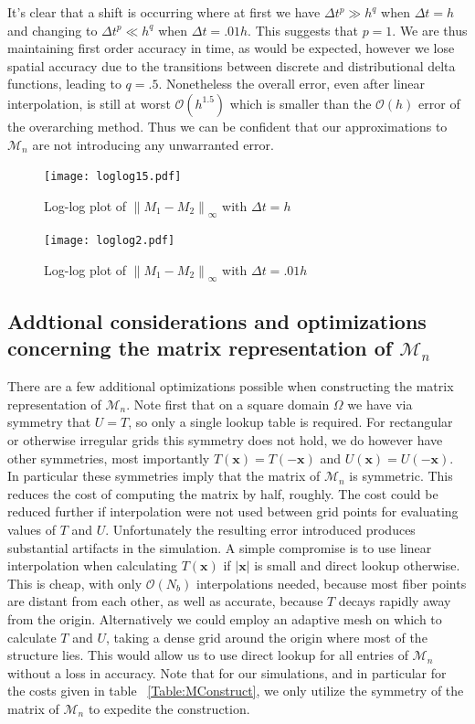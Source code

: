 \documentclass[preprint,12pt]{elsarticle}
\newcommand{\norm}[1]{\left\lVert#1\right\rVert}
\begin{document}
It's clear that a shift is occurring where at first we have $\Delta t^p \gg h^q$ when $\Delta t = h$ and changing to $\Delta t^p \ll h^q$ when $\Delta t = .01h$. This suggests that $p=1$. We are thus maintaining first order accuracy in time, as would be expected, however we lose spatial accuracy due to the transitions between discrete and distributional delta functions, leading to $q=.5$. Nonetheless the overall error, even after linear interpolation, is still at worst $\mathcal{O}(h^{1.5})$ which is smaller than the $\mathcal{O}(h)$ error of the overarching method. Thus we can be confident that our approximations to $\mathcal{M}_n$ are not introducing any unwarranted error.


\begin{figure}[!b]
  \begin{center}
    \texttt{[image: loglog15.pdf]}
  \end{center}
  \caption{\small Log-log plot of $\norm{M_1-M_2}_\infty$ with $\Delta t = h$}
  \label{fig:loglog15}
\hfill
  \begin{center}
    \texttt{[image: loglog2.pdf]}
  \end{center}
  \caption{\small Log-log plot of $\norm{M_1-M_2}_\infty$ with $\Delta t = .01h$}
  \label{fig:loglog2}
\end{figure}

\subsection{Addtional considerations and optimizations concerning the matrix representation of $\mathcal{M}_n$}
There are a few additional optimizations possible when constructing the matrix representation of $\mathcal{M}_n$.
Note first that on a square domain $\Omega$ we have via symmetry that $U=T$, so only a single lookup table is required.
For rectangular or otherwise irregular grids this symmetry does not hold, we do however have other symmetries, most importantly $T(\mathbf{x}) = T(-\mathbf{x})$ and $U(\mathbf{x}) = U(-\mathbf{x})$.
In particular these symmetries imply that the matrix of $\mathcal{M}_n$ is symmetric. This reduces the cost of computing the matrix by half, roughly. The cost could be reduced further if interpolation were not used between grid points for evaluating values of $T$ and $U$. Unfortunately the resulting error introduced produces substantial artifacts in the simulation. A simple compromise is to use linear interpolation when calculating $T(\mathbf{x})$ if $|\mathbf{x}|$ is small and direct lookup otherwise. This is cheap, with only $\mathcal{O}(N_b)$ interpolations needed, because most fiber points are distant from each other, as well as accurate, because $T$ decays rapidly away from the origin. Alternatively we could employ an adaptive mesh on which to calculate $T$ and $U$, taking a dense grid around the origin where most of the structure lies. This would allow us to use direct lookup for all entries of $\mathcal{M}_n$ without a loss in accuracy. Note that for our simulations, and in particular for the costs given in table ~\ref{Table:MConstruct}, we only utilize the symmetry of the matrix of $\mathcal{M}_n$ to expedite the construction.
\end{document}
